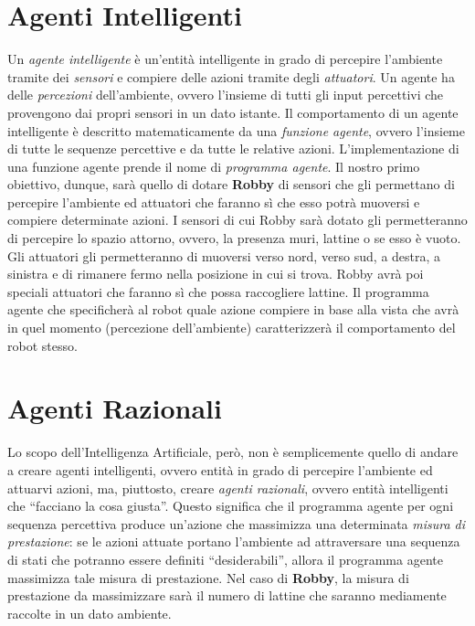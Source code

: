 \section{Agenti Intelligenti}
Un \textit{agente intelligente} è un'entità intelligente in grado di percepire
l'ambiente tramite dei \textit{sensori} e compiere delle azioni tramite degli
\textit{attuatori}.\newline
Un agente ha delle \textit{percezioni} dell'ambiente, ovvero l'insieme di tutti
gli input percettivi che provengono dai propri sensori in un dato
istante.\newline
Il comportamento di un agente intelligente è descritto matematicamente da una
\textit{funzione agente}, ovvero l'insieme di tutte le sequenze percettive
e da tutte le relative azioni. L'implementazione di una funzione agente prende
il nome di \textit{programma agente}.\newline
Il nostro primo obiettivo, dunque, sarà quello di dotare \textbf{Robby} di
sensori che gli permettano di percepire l'ambiente ed attuatori che faranno sì
che esso potrà muoversi e compiere determinate azioni.\newline
I sensori di cui Robby sarà dotato gli permetteranno di percepire lo spazio
attorno, ovvero, la presenza muri, lattine o se esso è vuoto. Gli attuatori gli
permetteranno di muoversi verso nord, verso sud, a destra, a sinistra e di
rimanere fermo nella posizione in cui si trova. Robby avrà poi speciali
attuatori che faranno sì che possa raccogliere lattine.\newline
Il programma agente che specificherà al robot quale azione compiere in base alla
vista che avrà in quel momento (percezione dell'ambiente) caratterizzerà il
comportamento del robot stesso.

\section{Agenti Razionali}
Lo scopo dell'Intelligenza Artificiale, però, non è semplicemente quello di
andare a creare agenti intelligenti, ovvero entità in grado di percepire
l'ambiente ed attuarvi azioni, ma, piuttosto, creare \textit{agenti
razionali}, ovvero entità intelligenti che ``facciano la cosa giusta''.\newline
Questo significa che il programma agente per ogni sequenza percettiva produce
un'azione che massimizza una determinata \textit{misura di prestazione}: se le
azioni attuate portano l'ambiente ad attraversare una sequenza di stati che
potranno essere definiti ``desiderabili'', allora il programma agente massimizza
tale misura di prestazione.\newline
Nel caso di \textbf{Robby}, la misura di prestazione da massimizzare sarà il
numero di lattine che saranno mediamente raccolte in un dato ambiente.

